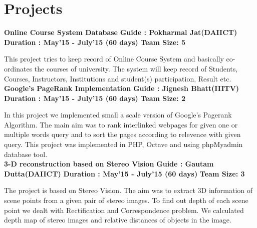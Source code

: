 \documentclass{article}
\begin{document}
\vspace*{.5cm}
\section{Projects}
\textbf{\large{Online Course System Database}} \hspace*{6cm} \textbf{Guide : Pokharmal Jat(DAIICT)}
\textbf{Duration : May'15 - July'15 (60 days)} \hspace*{5.7cm} \textbf{Team Size: 5}

\vspace*{.051mm}
\hspace*{2.6mm} This project tries to keep record of Online Course System and basically co-ordinates the courses of university. The system will keep record of Students, Courses, Instructors, Institutions and student(s) participation, Result etc.\\

\textbf{\large{Google's PageRank Implementation}} \hspace*{6cm} \textbf{Guide : Jignesh Bhatt(IIITV)}
\textbf{Duration : May'15 - July'15 (60 days)}\hspace*{5.5cm} \textbf{Team Size: 2}

\vspace*{.051mm}
\hspace*{2.6mm} In this project we implemented small a scale version of Google's Pagerank Algorithm. The main aim was to rank interlinked webpages for given one or multiple words query and to sort the pages according to relevence with given query. This project was implemented in PHP, Octave and using phpMyadmin database tool.\\

\textbf{\large{3-D reconstruction based on Stereo Vision}} \hspace*{3.6cm} \textbf{Guide : Gautam Dutta(DAIICT)}
\textbf{Duration : May'15 - July'15 (60 days)} \hspace*{4.7cm} \textbf{Team Size: 3}

\vspace*{.051mm}
\hspace*{2.6mm} The project is based on Stereo Vision. The aim was to extract 3D information of scene points from a given pair of stereo images. To find out depth of each scene point we dealt with Rectification and Correspondence problem. We calculated depth map of stereo images and relative distances of objects in the image.

\vspace*{.5cm}
\end{document}
